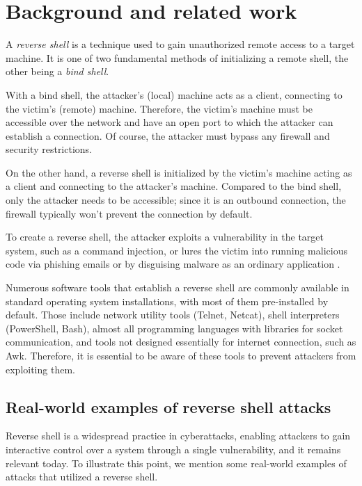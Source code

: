 \chapter{Background and related work}

\label{chap:background}


A \textit{reverse shell} is a technique used to gain unauthorized remote access to a target machine. It is one of two fundamental methods of initializing a remote shell, the other being a \textit{bind shell}.

With a bind shell, the attacker's (local) machine acts as a client, connecting to the victim's (remote) machine. Therefore, the victim's machine must be accessible over the network and have an open port to which the attacker can establish a connection. Of course, the attacker must bypass any firewall and security restrictions.

On the other hand, a reverse shell is initialized by the victim's machine acting as a client and connecting to the attacker's machine. Compared to the bind shell, only the attacker needs to be accessible; since it is an outbound connection, the firewall typically won't prevent the connection by default.

To create a reverse shell, the attacker exploits a vulnerability in the target system, such as a command injection, or lures the victim into running malicious code via phishing emails or by disguising malware as an ordinary application \cite{imperva}.

Numerous software tools that establish a reverse shell are commonly available in standard operating system installations, with most of them pre-installed by default. Those include network utility tools (Telnet, Netcat), shell interpreters (PowerShell, Bash), almost all programming languages with libraries for socket communication, and tools not designed essentially for internet connection, such as Awk. Therefore, it is essential to be aware of these tools to prevent attackers from exploiting them.


\section{Real-world examples of reverse shell attacks}

Reverse shell is a widespread practice in cyberattacks, enabling attackers to gain interactive control over a system through a single vulnerability, and it remains relevant today. To illustrate this point, we mention some real-world examples of attacks that utilized a reverse shell. 


